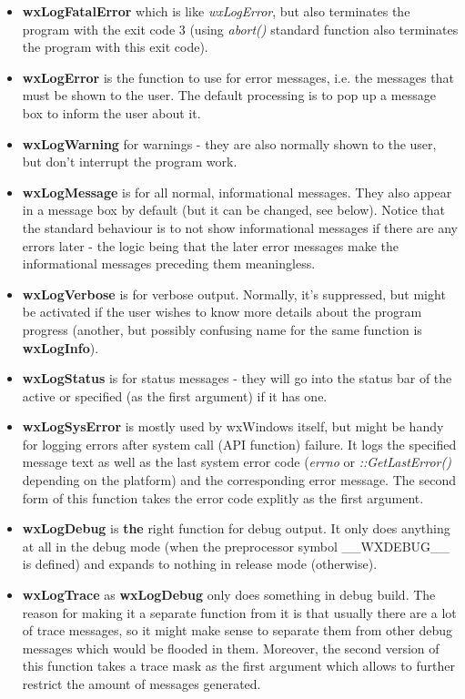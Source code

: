 \begin{itemize}\itemsep=0pt
\item{\bf wxLogFatalError} which is like {\it wxLogError}, but also
terminates the program with the exit code 3 (using {\it abort()} standard
function also terminates the program with this exit code).
\item{\bf wxLogError} is the function to use for error messages, i.e. the
messages that must be shown to the user. The default processing is to pop up a
message box to inform the user about it.
\item{\bf wxLogWarning} for warnings - they are also normally shown to the
user, but don't interrupt the program work.
\item{\bf wxLogMessage} is for all normal, informational messages. They also
appear in a message box by default (but it can be changed, see below). Notice
that the standard behaviour is to not show informational messages if there are
any errors later - the logic being that the later error messages make the
informational messages preceding them meaningless.
\item{\bf wxLogVerbose} is for verbose output. Normally, it's suppressed, but
might be activated if the user wishes to know more details about the program
progress (another, but possibly confusing name for the same function is {\bf
wxLogInfo}).
\item{\bf wxLogStatus} is for status messages - they will go into the status
bar of the active or specified (as the first argument)  if it has one.
\item{\bf wxLogSysError} is mostly used by wxWindows itself, but might be
handy for logging errors after system call (API function) failure. It logs the
specified message text as well as the last system error
code ({\it errno} or {\it ::GetLastError()} depending on the platform) and the corresponding error
message. The second form of this function takes the error code explitly as the
first argument.
\item{\bf wxLogDebug} is {\bf the} right function for debug output. It only
does anything at all in the debug mode (when the preprocessor symbol
\_\_WXDEBUG\_\_ is defined) and expands to nothing in release mode (otherwise).
\item{\bf wxLogTrace} as {\bf wxLogDebug} only does something in debug
build. The reason for making it a separate function from it is that usually
there are a lot of trace messages, so it might make sense to separate them
from other debug messages which would be flooded in them. Moreover, the second
version of this function takes a trace mask as the first argument which allows
to further restrict the amount of messages generated.
\end{itemize}

